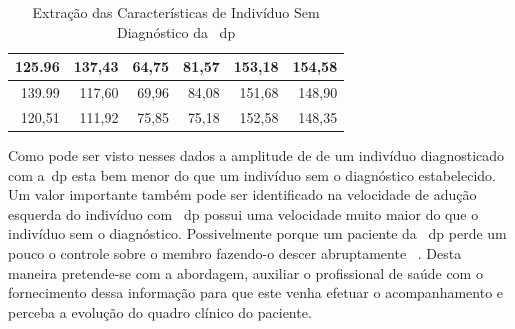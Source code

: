 \begin{table}[h]
\begin{tabular}{|r|r|r|r|r|r|}
125.96                                                                                   & 137,43                                                                                   & 64,75                                                              & 81,57                                                             & 153,18            & 154,58             \\ \hline
139.99                                                                                   & 117,60                                                                                   & 69,96                                                              & 84,08                                                             & 151,68            & 148,90             \\ \hline
120,51                                                                                   & 111,92                                                                                   & 75,85                                                              & 75,18                                                             & 152,58            & 148,35             \\ \hline
\end{tabular}
\caption{Extração das Características de Indivíduo Sem Diagnóstico da ~\ac{dp}}
\label{table:extracao_caracterisca_saudavel}
\end{table}

Como pode ser visto nesses dados a amplitude de de um indivíduo diagnosticado com a~\ac{dp} esta bem menor do que um indivíduo sem o diagnóstico estabelecido. Um valor importante também pode ser identificado na velocidade de adução esquerda do indivíduo com ~\ac{dp} possui uma velocidade muito maior do que o indivíduo sem o diagnóstico. Possivelmente porque um paciente da ~\ac{dp} perde um pouco o controle sobre o membro fazendo-o descer abruptamente ~\cite{protpar010}. Desta maneira pretende-se com a abordagem, auxiliar o profissional de saúde com o fornecimento dessa informação para que este venha efetuar o acompanhamento e perceba a evolução do quadro clínico do paciente.


%

